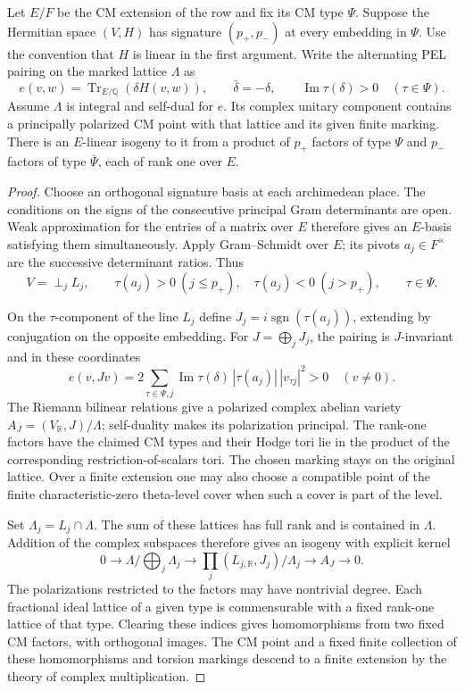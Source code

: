 \begin{auxlemma}\label{lem:marked-two-type-seed}
Let \(E/F\) be the CM extension of the row and fix its CM type
\(\Psi\). Suppose the Hermitian space \((V,H)\) has signature
\((p_+,p_-)\) at every embedding in \(\Psi\). Use the convention
that \(H\) is linear in the first argument. Write the alternating
PEL pairing on the marked lattice \(\Lambda\) as
\[
    e(v,w)=\operatorname{Tr}_{E/\mathbb Q}(\delta H(v,w)),\qquad
    \bar\delta=-\delta,\qquad \operatorname{Im}\tau(\delta)>0
             \quad(\tau\in\Psi).
\]
Assume \(\Lambda\) is integral and self-dual for \(e\). Its complex
unitary component contains a principally polarized CM point with
that lattice and its given finite marking. There is an \(E\)-linear
isogeny to it from a product of \(p_+\) factors of type \(\Psi\)
and \(p_-\) factors of type \(\bar\Psi\), each of rank one over \(E\).
\end{auxlemma}
\begin{proof}
Choose an orthogonal signature basis at each archimedean place.
The conditions on the signs of the consecutive principal Gram
determinants are open. Weak approximation for the entries of a
matrix over \(E\) therefore gives an \(E\)-basis satisfying them
simultaneously. Apply Gram--Schmidt over \(E\); its pivots
\(a_j\in F^\times\) are the successive determinant ratios. Thus
\[
 V=\mathop{\perp}_{j}L_j,\qquad
 \tau(a_j)>0\ (j\le p_+),\quad
 \tau(a_j)<0\ (j>p_+),\qquad \tau\in\Psi .
\]

On the \(\tau\)-component of the line \(L_j\) define
\(J_j=i\operatorname{sgn}(\tau(a_j))\), extending by conjugation on
the opposite embedding. For \(J=\bigoplus_j J_j\), the pairing is
\(J\)-invariant and in these coordinates
\[
  e(v,Jv)=2\sum_{\tau\in\Psi,j}
           \operatorname{Im}\tau(\delta)\,|\tau(a_j)|\,|v_{\tau j}|^2>0
                             \quad(v\ne0).
\]
The Riemann bilinear relations give a polarized complex abelian
variety \(A_J=(V_{\mathbb R},J)/\Lambda\); self-duality makes its
polarization principal. The rank-one factors have the claimed CM
types and their Hodge tori lie in the product of the corresponding
restriction-of-scalars tori. The chosen marking stays on the
original lattice. Over a finite extension one may also choose a
compatible point of the finite characteristic-zero theta-level cover
when such a cover is part of the level.

Set \(\Lambda_j=L_j\cap\Lambda\). The sum of these lattices has
full rank and is contained in \(\Lambda\). Addition of the
complex subspaces therefore gives an isogeny with explicit kernel
\[
  0\longrightarrow\Lambda/\!\bigoplus_j\Lambda_j
    \longrightarrow\prod_j (L_{j,\mathbb R},J_j)/\Lambda_j
    \longrightarrow A_J\longrightarrow0 .
\]
The polarizations restricted to the factors may have nontrivial
degree. Each fractional ideal lattice of a given type is
commensurable with a fixed rank-one lattice of that type. Clearing
these indices gives homomorphisms from two fixed CM factors, with
orthogonal images. The CM point and a fixed finite collection of
these homomorphisms and torsion markings descend to a finite
extension by the theory of complex multiplication.
\end{proof}

